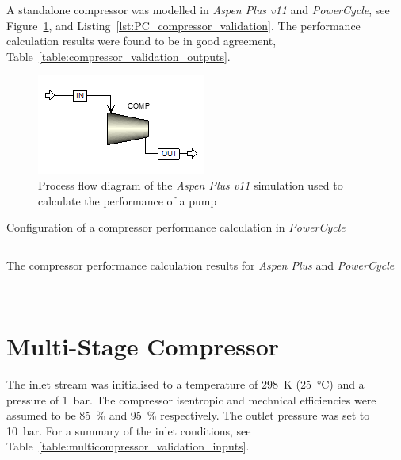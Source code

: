     A standalone compressor was modelled in \emph{Aspen Plus v11} and \emph{PowerCycle}, see Figure~\ref{fig:Aspen_comp_validation}, and Listing~\ref{lst:PC_compressor_validation}. The performance calculation results were found to be in good agreement, Table~\ref{table:compressor_validation_outputs}.

    \begin{figure}[H]
        \centering
        \includegraphics{Content/Appendices/Appendix_F/Figures/AspenPLus_CompValidation.png}
        \caption{Process flow diagram of the \emph{Aspen Plus v11} simulation used to calculate the performance of a pump}
        \label{fig:Aspen_comp_validation}
    \end{figure}

    \begin{listing}[H]
        \caption{Configuration of a compressor performance calculation in \emph{PowerCycle}}
        \inputminted[bgcolor=bg,linenos, fontsize=\footnotesize]{python}{Content/Appendices/Appendix_F/Code/CompressorPerf_snippet.py}
        \label{lst:PC_compressor_validation}
        \vspace{-20pt}
    \end{listing}

    \begin{table}[H]
        \caption{The compressor performance calculation results for \emph{Aspen Plus} and \emph{PowerCycle}}
        \centering 
        \label{table:compressor_validation_outputs}
        
        \\[10pt]
    \end{table}


\section{Multi-Stage Compressor}
    The inlet stream was initialised to a temperature of \qty{298}{\K} (\qty{25}{\degreeCelsius}) and a pressure of \qty{1}{\bar}. The compressor isentropic and mechnical efficiencies were assumed to be \qty{85}{\percent} and \qty{95}{\percent} respectively. The outlet pressure was set to \qty{10}{\bar}. For a summary of the inlet conditions, see Table~\ref{table:multicompressor_validation_inputs}.

